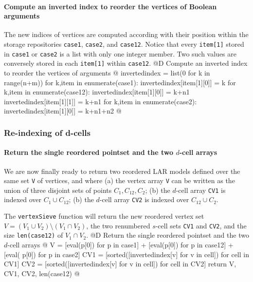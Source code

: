 \documentclass[11pt,oneside]{article}	%
\begin{document}
\paragraph{Compute an inverted index to reorder the vertices of Boolean arguments}
The new indices of vertices are computed according with their position within the storage repositories \texttt{case1}, \texttt{case2}, and \texttt{case12}. Notice that every \texttt{item[1]} stored in \texttt{case1} or \texttt{case2} is a list with only one integer member. Two such values are conversely stored in each \texttt{item[1]} within \texttt{case12}.
@D Compute an inverted index to reorder the vertices of arguments
@{
	invertedindex = list(0 for k in range(n+m))
	for k,item in enumerate(case1):
		invertedindex[item[1][0]] = k
	for k,item in enumerate(case12):
		invertedindex[item[1][0]] = k+n1
		invertedindex[item[1][1]] = k+n1
	for k,item in enumerate(case2):
		invertedindex[item[1][0]] = k+n1+n2
@}

\subsubsection{Re-indexing of d-cells}

\paragraph{Return the single reordered pointset and the two $d$-cell arrays}
We are now finally ready to return two reordered LAR models defined over the same set \texttt{V} of vertices, and where (a) the vertex array \texttt{V} can be written as the union of three disjoint sets of points $C_1,C_{12},C_2$; (b) the $d$-cell array \texttt{CV1} is indexed over $C_1\cup C_{12}$; (b) the $d$-cell array \texttt{CV2} is indexed over $C_{12}\cup C_{2}$. 

The \texttt{vertexSieve} function will return the new reordered vertex set $V = (V_1 \cup V_2) \setminus (V_1 \cap V_2)$, the two renumbered $s$-cell sets \texttt{CV1} and \texttt{CV2}, and the size \texttt{len(case12)} of $V_1 \cap V_2$.
@D Return the single reordered pointset and the two $d$-cell arrays
@{
	V = [eval(p[0]) for p in case1] + [eval(p[0]) for p in case12] + [eval(
				p[0]) for p in case2]
	CV1 = [sorted([invertedindex[v] for v in cell]) for cell in CV1]
	CV2 = [sorted([invertedindex[v] for v in cell]) for cell in CV2]
	return V, CV1, CV2, len(case12)
@}







\end{document}
